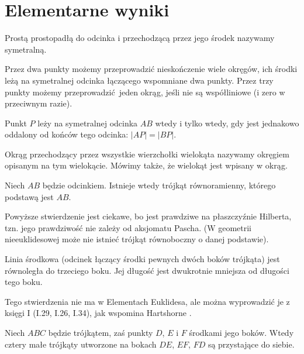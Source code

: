 \section{Elementarne wyniki}

\begin{definition}[symetralna]
	Prostą prostopadłą do odcinka i przechodzącą przez jego środek nazywamy symetralną.
\end{definition}
Przez dwa punkty możemy przeprowadzić nieskończenie wiele okręgów, ich środki leżą na symetralnej odcinka łączącego wspomniane dwa punkty.
Przez trzy punkty możemy przeprowadzić jeden okrąg, jeśli nie są współliniowe (i zero w przeciwnym razie).
\begin{proposition} %
	Punkt $P$ leży na symetralnej odcinka $AB$ wtedy i tylko wtedy, gdy jest jednakowo oddalony od końców tego odcinka: $|AP| = |BP|$.
\end{proposition}


Okrąg przechodzący przez wszystkie wierzchołki wielokąta nazywamy okręgiem opisanym na tym wielokącie.
Mówimy także, że wielokąt jest wpisany w okrąg.

\begin{proposition}
	\label{hartshorne_52x}
    Niech $AB$ będzie odcinkiem.
	Istnieje wtedy trójkąt równoramienny, którego podstawą jest $AB$.
\end{proposition}

Powyższe stwierdzenie jest ciekawe, bo jest prawdziwe na płaszczyźnie Hilberta, tzn. jego prawdziwość nie zależy od aksjomatu Pascha.
(W geometrii nieeuklidesowej może nie istnieć trójkąt równoboczny o danej podstawie).

\begin{proposition}
	\label{hartshorne_52}
	Linia środkowa (odcinek łączący środki pewnych dwóch boków trójkąta) jest równoległa do trzeciego boku.
    Jej długość jest dwukrotnie mniejsza od długości tego boku.
\end{proposition}

Tego stwierdzenia nie ma w Elementach Euklidesa, ale można wyprowadzić je z księgi I (I.29, I.26, I.34), jak wspomina Hartshorne \cite[s. 52. 53]{hartshorne2000}.

\begin{corollary}
	Niech $ABC$ będzie trójkątem, zaś punkty $D$, $E$ i $F$ środkami jego boków.
	Wtedy cztery małe trójkąty utworzone na bokach $DE$, $EF$, $FD$ są przystające do siebie.
\end{corollary}

